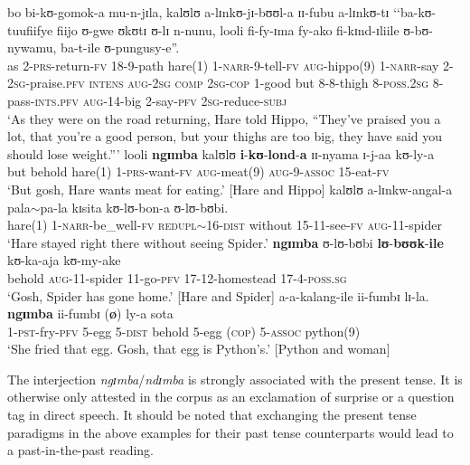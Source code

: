 \begin{exe}
\ex \label{exNarrativePresentNgimbaPRS}
\gll bo bi-kʊ-gomok-a mu-n-jɪla, kalʊlʊ a-lɪnkʊ-jɪ-bʊʊl-a ɪɪ-fubu a-lɪnkʊ-tɪ \textup{\lq\lq}ba-kʊ-tuufiifye fiijo ʊ-gwe ʊkʊtɪ ʊ-lɪ n-nunu, looli fi-fy-ɪma fy-ako fi-kɪnd-ɪliile ʊ-bʊ-nywamu, ba-t-ile ʊ-pungusy-e\textup{''}.\\
as 2-\textsc{prs}-return-\textsc{fv} 18-9-path hare(1) 1-\textsc{narr}-9-tell-\textsc{fv} \textsc{aug}-hippo(9) 1-\textsc{narr}-say \phantom{\lq\lq}2-\textsc{2sg}-praise.\textsc{pfv} \textsc{intens} \textsc{aug}-\textsc{2sg} \textsc{comp} \textsc{2sg}-\textsc{cop} 1-good but 8-8-thigh 8-\textsc{poss.2sg} 8-pass-\textsc{ints}.\textsc{pfv} \textsc{aug}-14-big 2-say-\textsc{pfv} \textsc{2sg}-reduce-\textsc{subj}\\
\glt \lq As they were on the road returning, Hare told Hippo, ``They've praised you a lot, that you're a good person, but your thighs are too big, they have said you should lose weight.''{}'
\sn \gll looli \textbf{ngɪmba} kalʊlʊ \textbf{i}-\textbf{kʊ}-\textbf{lond}-\textbf{a} ɪɪ-nyama ɪ-j-aa kʊ-ly-a\\
but behold hare(1) 1-\textsc{prs}-want-\textsc{fv} \textsc{aug}-meat(9) \textsc{aug}-9-\textsc{assoc} 15-eat-\textsc{fv}\\
\glt  \lq But gosh, Hare wants meat for eating.' [Hare and Hippo]
\ex \label{exNarrativePresentNgimbaPFV}\gll kalʊlʊ a-lɪnkw-angal-a pala$\sim$pa-la kɪsita kʊ-lʊ-bon-a ʊ-lʊ-bʊbi.\\
hare(1) 1-\textsc{narr}-be\_well-\textsc{fv}  \textsc{redupl}$\sim$16-\textsc{dist} without 15-11-see-\textsc{fv} \textsc{aug}-11-spider \\
\glt `Hare stayed right there without seeing Spider.'
\sn \gll \textbf{ngɪmba} ʊ-lʊ-bʊbi \textbf{lʊ}-\textbf{bʊʊk}-\textbf{ile} kʊ-ka-aja kʊ-my-ake\\
behold \textsc{aug}-11-spider 11-go-\textsc{pfv} 17-12-homestead 17-4-\textsc{poss.sg}\\
\glt \lq Gosh, Spider has gone home.' [Hare and Spider]
\ex \label{exNarrativePresentNgimbaCOP}\gll a-a-kalang-ile ii-fumbɪ lɪ-la. \textbf{ngɪmba} ii-fumbɪ \textup{(}\textbf{ø}\textup{)} ly-a sota\\
1-\textsc{pst}-fry-\textsc{pfv} 5-egg 5-\textsc{dist} behold 5-egg (\textsc{cop}) 5-\textsc{assoc} python(9)\\
\glt \lq She fried that egg. Gosh, that egg is Python's.' [Python and woman]
\end{exe}

The interjection \textit{ngɪmba}/\textit{ndɪmba} is strongly associated with the present tense. It is otherwise only attested in the corpus as an exclamation of surprise or a question tag in direct speech. It should be noted that exchanging the present tense paradigms in the above examples for their past tense counterparts would lead to a past-in-the-past reading.

